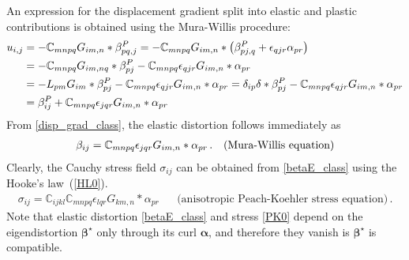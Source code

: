 An expression for the displacement gradient split into elastic and plastic contributions is obtained  using the Mura-Willis procedure: 
\begin{align}
u_{i,j}&=-\mathbb{C}_{mnpq}G_{im,n}*\beta^{P}_{pq,j}
=-\mathbb{C}_{mnpq}G_{im,n}*\left(\beta^{P}_{pj,q}+\epsilon_{qjr}\alpha_{pr}\right)\nonumber\\
&=-\mathbb{C}_{mnpq}G_{im,nq}*\beta^{P}_{pj}-\mathbb{C}_{mnpq}\epsilon_{qjr}G_{im,n}*\alpha_{pr}\nonumber\\
&=-L_{pm}G_{im}*\beta^{P}_{pj}-\mathbb{C}_{mnpq}\epsilon_{qjr}G_{im,n}*\alpha_{pr}=\delta_{ip}\delta*\beta^{P}_{pj}-\mathbb{C}_{mnpq}\epsilon_{qjr}G_{im,n}*\alpha_{pr}\nonumber\\
&=\beta^{P}_{ij}+\mathbb{C}_{mnpq}\epsilon_{jqr}G_{im,n}*\alpha_{pr}
\label{disp_grad_class}
\end{align}
From \eqref{disp_grad_class}, the elastic distortion follows immediately as
\begin{align}
\beta_{ij}=\mathbb{C}_{mnpq}\epsilon_{jqr}G_{im,n}*\alpha_{pr}\,. && \text{(Mura-Willis equation)}
\label{betaE_class}
\end{align}
Clearly, the Cauchy stress field $\sigma_{ij}$ can be obtained from \eqref{betaE_class} using the Hooke's law~(\ref{HL0}). 
\begin{align}
\sigma_{ij}=\mathbb{C}_{ijkl}\mathbb{C}_{mnpq}\epsilon_{lqr}G_{km,n}*\alpha_{pr} &&
\text{(anisotropic Peach-Koehler stress equation)}\,.
\label{PK0}
\end{align}
Note that elastic distortion \eqref{betaE_class} and stress \eqref{PK0} depend on the eigendistortion $\bm \beta^\star$ only through its curl $\bm \alpha$, and therefore they vanish is  $\bm \beta^\star$ is compatible.

